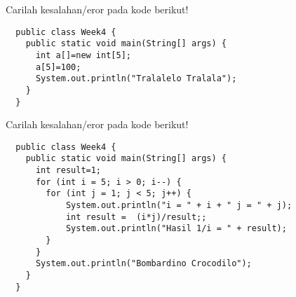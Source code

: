 \documentclass{../praktikum-ppt}
\begin{document}
    \begin{frame}[fragile]
      \begin{game}
        Carilah kesalahan/eror pada kode berikut!
      \end{game}
      \begin{lstlisting}
  public class Week4 { 
    public static void main(String[] args) {        
      int a[]=new int[5];        
      a[5]=100;    
      System.out.println("Tralalelo Tralala"); 
    } 
  }
      \end{lstlisting}
    \end{frame}
    \begin{frame}[fragile]
      \begin{game}
        Carilah kesalahan/eror pada kode berikut!
      \end{game}
      \begin{lstlisting}
  public class Week4 { 
    public static void main(String[] args) {     
      int result=1;   
      for (int i = 5; i > 0; i--) {
        for (int j = 1; j < 5; j++) {
            System.out.println("i = " + i + " j = " + j);
            int result =  (i*j)/result;;
            System.out.println("Hasil 1/i = " + result);
        }
      }
      System.out.println("Bombardino Crocodilo"); 
    } 
  }
      \end{lstlisting}
    \end{frame}
\end{document}

